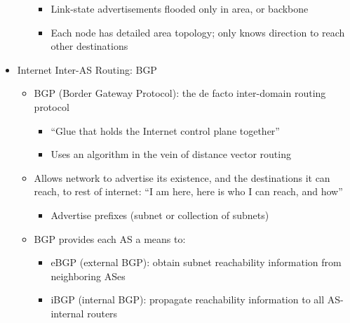 \begin{itemize}
\begin{itemize}
\begin{itemize}
          \item Link-state advertisements flooded only in area, or backbone

          \item Each node has detailed area topology; only knows direction to reach other destinations

        \end{itemize}

    \end{itemize}

  \item Internet Inter-AS Routing: BGP

    \begin{itemize}

      \item BGP (Border Gateway Protocol): the de facto inter-domain routing protocol

        \begin{itemize}

          \item ``Glue that holds the Internet control plane together''

          \item Uses an algorithm in the vein of distance vector routing

        \end{itemize}

      \item Allows network to advertise its existence, and the destinations it can reach, to rest of internet: ``I am here, here is who I can reach, and how''

        \begin{itemize}

          \item Advertise prefixes (subnet or collection of subnets)

        \end{itemize}

      \item BGP provides each AS a means to:

        \begin{itemize}

          \item eBGP (external BGP): obtain subnet reachability information from neighboring ASes

          \item iBGP (internal BGP): propagate reachability information to all AS-internal routers


\end{itemize}
\end{itemize}
\end{itemize}
